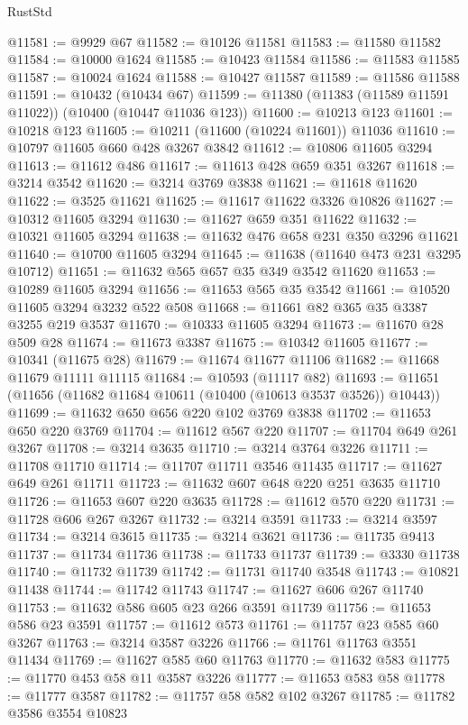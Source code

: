 \begin{lexlean}{RustStd}
\begin{coremodule}
@11581 := @9929 @67
@11582 := @10126 @11581
@11583 := @11580 @11582
@11584 := @10000 @1624
@11585 := @10423 @11584
@11586 := @11583 @11585
@11587 := @10024 @1624
@11588 := @10427 @11587
@11589 := @11586 @11588
@11591 := @10432 (@10434 @67)
@11599 := @11380 (@11383 (@11589 @11591 @11022)) (@10400 (@10447 @11036 @123))
@11600 := @10213 @123
@11601 := @10218 @123
@11605 := @10211 (@11600 (@10224 @11601)) @11036
@11610 := @10797 @11605 @660 @428 @3267 @3842
@11612 := @10806 @11605 @3294
@11613 := @11612 @486
@11617 := @11613 @428 @659 @351 @3267
@11618 := @3214 @3542
@11620 := @3214 @3769 @3838
@11621 := @11618 @11620
@11622 := @3525 @11621
@11625 := @11617 @11622 @3326 @10826
@11627 := @10312 @11605 @3294
@11630 := @11627 @659 @351 @11622
@11632 := @10321 @11605 @3294
@11638 := @11632 @476 @658 @231 @350 @3296 @11621
@11640 := @10700 @11605 @3294
@11645 := @11638 (@11640 @473 @231 @3295 @10712)
@11651 := @11632 @565 @657 @35 @349 @3542 @11620
@11653 := @10289 @11605 @3294
@11656 := @11653 @565 @35 @3542
@11661 := @10520 @11605 @3294 @3232 @522 @508
@11668 := @11661 @82 @365 @35 @3387 @3255 @219 @3537
@11670 := @10333 @11605 @3294
@11673 := @11670 @28 @509 @28
@11674 := @11673 @3387
@11675 := @10342 @11605
@11677 := @10341 (@11675 @28)
@11679 := @11674 @11677 @11106
@11682 := @11668 @11679 @11111 @11115
@11684 := @10593 (@11117 @82)
@11693 := @11651 (@11656 (@11682 @11684 @10611 (@10400 (@10613 @3537 @3526)) @10443))
@11699 := @11632 @650 @656 @220 @102 @3769 @3838
@11702 := @11653 @650 @220 @3769
@11704 := @11612 @567 @220
@11707 := @11704 @649 @261 @3267
@11708 := @3214 @3635
@11710 := @3214 @3764 @3226
@11711 := @11708 @11710
@11714 := @11707 @11711 @3546 @11435
@11717 := @11627 @649 @261 @11711
@11723 := @11632 @607 @648 @220 @251 @3635 @11710
@11726 := @11653 @607 @220 @3635
@11728 := @11612 @570 @220
@11731 := @11728 @606 @267 @3267
@11732 := @3214 @3591
@11733 := @3214 @3597
@11734 := @3214 @3615
@11735 := @3214 @3621
@11736 := @11735 @9413
@11737 := @11734 @11736
@11738 := @11733 @11737
@11739 := @3330 @11738
@11740 := @11732 @11739
@11742 := @11731 @11740 @3548
@11743 := @10821 @11438
@11744 := @11742 @11743
@11747 := @11627 @606 @267 @11740
@11753 := @11632 @586 @605 @23 @266 @3591 @11739
@11756 := @11653 @586 @23 @3591
@11757 := @11612 @573
@11761 := @11757 @23 @585 @60 @3267
@11763 := @3214 @3587 @3226
@11766 := @11761 @11763 @3551 @11434
@11769 := @11627 @585 @60 @11763
@11770 := @11632 @583
@11775 := @11770 @453 @58 @11 @3587 @3226
@11777 := @11653 @583 @58
@11778 := @11777 @3587
@11782 := @11757 @58 @582 @102 @3267
@11785 := @11782 @3586 @3554 @10823

\end{coremodule}
\end{lexlean}

